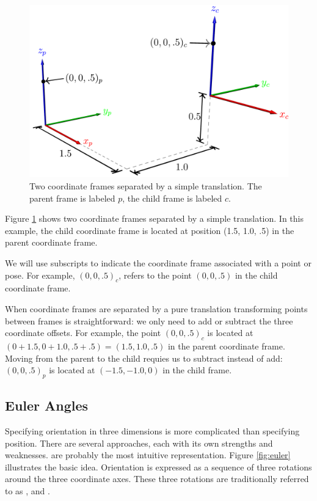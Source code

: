 \begin{figure}
\begin{center}
\includegraphics[]{frames/figs/translation.png}
\end{center}
\caption{Two coordinate frames separated by a simple translation. The
  parent frame is labeled $p$, the child frame is labeled $c$. }
\label{fig:translation}
\end{figure}

Figure \ref{fig:translation} shows two coordinate frames separated by
a simple translation.  In this example, the child coordinate frame
is located at position (1.5, 1.0, .5) in the parent coordinate
frame.

We will use subscripts to indicate the coordinate
frame associated with a point or pose.  For example,
$(0, 0, .5)_c$, refers to the point $(0, 0, .5)$
in the child coordinate frame.

When coordinate frames are separated by a pure translation
transforming points between frames is straightforward: we only need to
add or subtract the three coordinate offsets.  For example, the point
$(0, 0, .5)_c$ is located at $(0 + 1.5, 0 + 1.0, .5 + .5) =
(1.5, 1.0, .5)$ in the parent coordinate frame.  Moving from the
parent to the child requies us to subtract instead of add: $(0, 0,
.5)_p$ is located at $(-1.5, -1.0, 0)$ in the child frame.


\subsection{Euler Angles}
\label{sec:euler}

Specifying orientation in three dimensions is more complicated than
specifying position.  There are several approaches, each with its own
strengths and weaknesses.   are probably the most
intuitive representation. Figure \ref{fig:euler} illustrates the basic
idea.  Orientation is expressed as a sequence of three rotations
around the three coordinate axes.  These three rotations are
traditionally referred to as ,  and .

